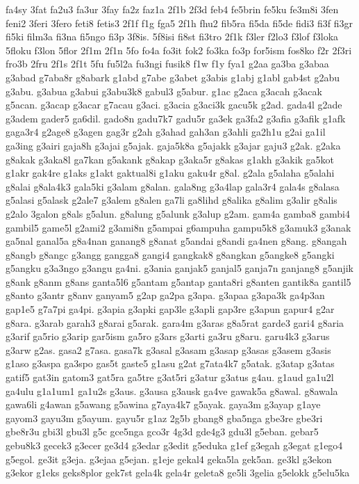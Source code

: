 {fa4sy 3fat fa2u3 fa3ur 3fay fa2z faz1a 2f1b 2f3d feb4 fe5brin fe5ku fe3m8i
3fen feni2 3feri 3fero feti8 fetis3 2f1f f1g fga5 2f1h fhu2 fib5ra fi5da
fi5de fidi3 fi3f fi3gr fi5ki film3a fi3na fi5ngo fi3p 3f8is. 5f8isi fi8st
fi3tro 2f1k f3ler f2lo3 f3lof f3loka 5floku f3lon 5flor 2f1m 2f1n 5fo fo4a
fo3it fok2 fo3ka fo3p for5ism fos8ko f2r 2f3ri fro3b 2fru 2f1s 2f1t 5fu
fu5l2a fu3ngi fusik8 f1w f1y fya1 g2aa ga3ba g3abaa g3abad g7aba8r g8abark
g1abd g7abe g3abet g3abis g1abj g1abl gab4st g2abu g3abu. g3abua g3abui
g3abu3k8 gabul3 g5abur. g1ac g2aca g3acah g3acak g5acan. g3acap g3acar
g7acau g3aci. g3acia g3aci3k gacu5k g2ad. gada4l g2ade g3adem gader5
ga6dil. gado8n gadu7k7 gadu5r ga3ek ga3fa2 g3afia g3afik g1afk gaga3r4
g2age8 g3agen gag3r g2ah g3ahad gah3an g3ahli ga2h1u g2ai ga1il ga3ing
g3airi gaja8h g3ajai g5ajak. gaja5k8a g5ajakk g3ajar gaju3 g2ak. g2aka
g8akak g3aka8l ga7kan g5akank g8akap g3aka5r g8akas g1akh g3akik ga5kot
g1akr gak4re g1aks g1akt gaktual8i g1aku gaku4r g8al. g2ala g5alaha
g5alahi g8alai g8ala4k3 gala5ki g3alam g8alan. gala8ng g3a4lap gala3r4
gala4s g8alasa g5alasi g5alask g2ale7 g3alem g8alen ga7li ga8lihd g8alika
g8alim g3alir g8alis g2alo 3galon g8als g5alun. g8alung g5alunk g3alup
g2am. gam4a gamba8 gambi4 gambil5 game5l g2ami2 g3ami8n g5ampai g6ampuha
gampu5k8 g3amuk3 g3anak ga5nal ganal5a g8a4nan ganang8 g8anat g5andai
g8andi ga4nen g8ang. g8angah g8angb g8angc g3angg gangga8 gangi4 gangkak8
g8angkan g5angke8 g5angki g5angku g3a3ngo g3angu ga4ni. g3ania ganjak5
ganjal5 ganja7n ganjang8 g5anjik g8ank g8anm g8ans ganta5l6 g5antam
g5antap ganta8ri g8anten gantik8a gantil5 g8anto g3antr g8anv ganyam5 g2ap
ga2pa g3apa. g3apaa g3apa3k ga4p3an gap1e5 g7a7pi ga4pi. g3apia g3apki
gap3le g3apli gap3re g3apun gapur4 g2ar g8ara. g3arab garah3 g8arai
g5arak. gara4m g3aras g8a5rat garde3 gari4 g8aria g3arif ga5rio g3arip
gar5ism ga5ro g3ars g3arti ga3ru g8aru. garu4k3 g3arus g3arw g2as. gasa2
g7asa. gasa7k g3asal g3asam g3asap g3asas g3asem g3asis g1aso g3aspa
ga3spo gas5t gaste5 g1asu g2at g7ata4k7 g5atak. g3atap g3atas gatif5
gat3in gatom3 gat5ra ga5tre g3at5ri g3atur g3atus g4au. g1aud ga1u2l
ga4ulu g1a1um1 ga1u2s g3aus. g3ausa g3ausk ga4ve gawak5a g8awal. g8awala
gawa6li g4awan g5awang g5awina g7aya4k7 g5ayak. gaya3m g3ayap g1aye gayom3
gayu3m g5ayum. gayu5r g1az 2g5b gbang8 gba5nga gbe3re gbe3ri gbe8r3u gbi3l
gbu3l g5c gce5nga gco3r 4g3d gde4g3 gdu3l g5eban. gebar5 gebu8k3 gecek3
g3ecer ge3d4 g3edar g3edit g5eduka g1ef g3egah g3egat g1ego4 g5egol. ge3it
g3eja. g3ejaa g5ejan. g1eje gekal4 geka5la gek5an. ge3kl g3ekon g3ekor
g1eks geks8plor gek7st gela4k gela4r geleta8 ge5li 3gelia g5elokk g5elu5ka
}
